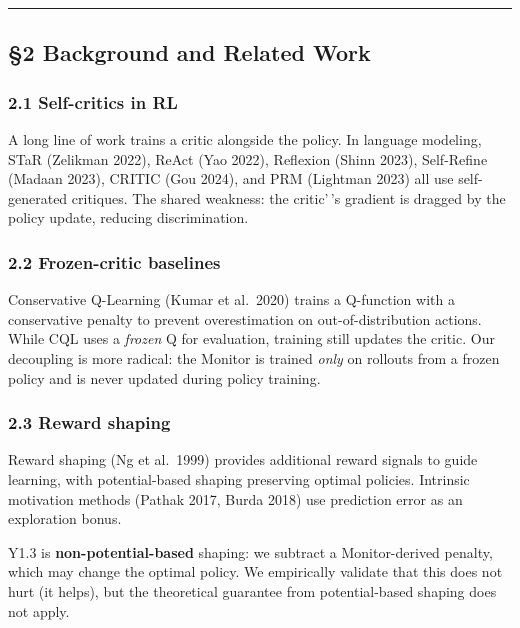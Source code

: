 \documentclass[
]{article}
\begin{document}
\begin{center}\rule{0.5\linewidth}{0.5pt}\end{center}

\subsection{§2 Background and Related
Work}\label{background-and-related-work}

\subsubsection{2.1 Self-critics in RL}\label{self-critics-in-rl}

A long line of work trains a critic alongside the policy. In language
modeling, STaR (Zelikman 2022), ReAct (Yao 2022), Reflexion (Shinn
2023), Self-Refine (Madaan 2023), CRITIC (Gou 2024), and PRM (Lightman
2023) all use self-generated critiques. The shared weakness: the
critic'\,'s gradient is dragged by the policy update, reducing
discrimination.

\subsubsection{2.2 Frozen-critic
baselines}\label{frozen-critic-baselines}

Conservative Q-Learning (Kumar et al.~2020) trains a Q-function with a
conservative penalty to prevent overestimation on out-of-distribution
actions. While CQL uses a \emph{frozen} Q for evaluation, training still
updates the critic. Our decoupling is more radical: the Monitor is
trained \emph{only} on rollouts from a frozen policy and is never
updated during policy training.

\subsubsection{2.3 Reward shaping}\label{reward-shaping}

Reward shaping (Ng et al.~1999) provides additional reward signals to
guide learning, with potential-based shaping preserving optimal
policies. Intrinsic motivation methods (Pathak 2017, Burda 2018) use
prediction error as an exploration bonus.

Y1.3 is \textbf{non-potential-based} shaping: we subtract a
Monitor-derived penalty, which may change the optimal policy. We
empirically validate that this does not hurt (it helps), but the
theoretical guarantee from potential-based shaping does not apply.
\end{document}

